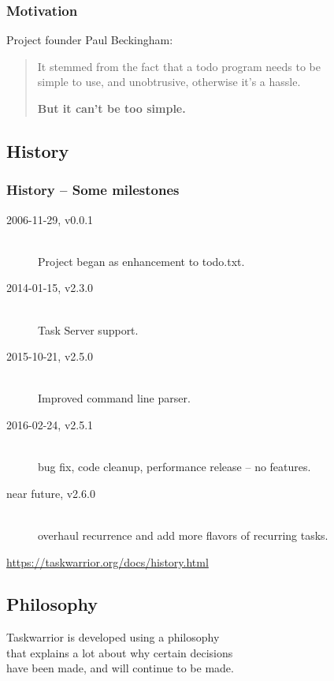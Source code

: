 \documentclass[t,handout,aspectratio=169]{beamer}
\begin{document}
\begin{frame}[fragile]\frametitle{Motivation}
    \vfill
    Project founder Paul Beckingham:

    \begin{quote}
        It stemmed from the fact that a todo program needs to be \\
        simple to use, and unobtrusive, otherwise it's a hassle. \pause

        \textbf{But it can't be too simple.}
    \end{quote}
\end{frame}

\subsection{History}

\begin{frame}[fragile]\frametitle{History -- Some milestones}
    \vfill
    \begin{description}
        \item[2006-11-29, v0.0.1]  \hfill \\
            Project began as enhancement to todo.txt.
        \item[2014-01-15, v2.3.0]  \hfill \\
            Task Server support.
        \item[2015-10-21, v2.5.0]  \hfill \\
            Improved command line parser.
        \item[2016-02-24, v2.5.1]  \hfill \\
            bug fix, code cleanup, performance release -- no features.
        \item[near future, v2.6.0] \hfill \\
            overhaul recurrence and add more flavors of recurring tasks.
    \end{description}
    \url{https://taskwarrior.org/docs/history.html}
\end{frame}

\subsection{Philosophy}

\begin{frame}[standout]
    Taskwarrior is developed using a philosophy \\
    that explains a lot about why certain decisions \\
    have been made, and will continue to be made.
\end{frame}
\end{document}
